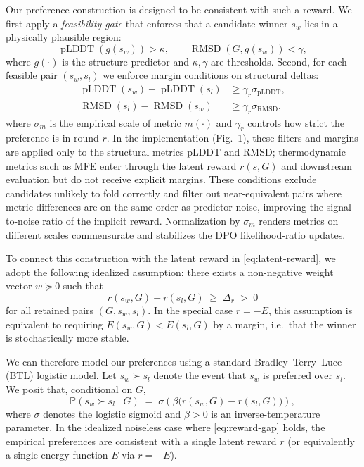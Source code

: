 {{Our preference construction is designed to be consistent with such a reward.
We first apply a \emph{feasibility gate} that enforces that a candidate
winner $s_w$ lies in a physically plausible region:
\begin{equation}
    \operatorname{pLDDT}(g(s_w)) > \kappa, \qquad
    \operatorname{RMSD}(G, g(s_w)) < \gamma,
    \label{eq:gate_appendix_legacy}
\end{equation}
where $g(\cdot)$ is the structure predictor and
$\kappa, \gamma$ are thresholds.
Second, for each feasible pair $(s_w, s_l)$ we enforce margin
conditions on structural deltas:
\begin{align}
    \operatorname{pLDDT}(s_w) - \operatorname{pLDDT}(s_l)
    &\ge \gamma_r \sigma_{\text{pLDDT}},
    \label{eq:margin-plddt}
    \\
    \operatorname{RMSD}(s_l) - \operatorname{RMSD}(s_w)
    &\ge \gamma_r \sigma_{\text{RMSD}},
    \label{eq:margin-rmsd}
\end{align}
where $\sigma_m$ is the empirical scale of metric $m(\cdot)$ and
$\gamma_r$ controls how strict the preference is in round $r$.
In the implementation (Fig.~1), these filters and margins are applied only
to the structural metrics pLDDT and RMSD; thermodynamic metrics such as MFE
enter through the latent reward $r(s,G)$ and downstream evaluation but do
not receive explicit margins.
These conditions exclude candidates unlikely to fold correctly and filter out
near-equivalent pairs where metric differences are on the same order as
predictor noise, improving the signal-to-noise ratio of the implicit reward.
Normalization by $\sigma_m$ renders metrics on different scales commensurate
and stabilizes the DPO likelihood-ratio updates.

To connect this construction with the latent reward in
\eqref{eq:latent-reward}, we adopt the following idealized assumption:
there exists a non-negative weight vector
$w \succeq 0$ such that
\begin{equation}
    r(s_w, G) - r(s_l, G) \;\geq\; \Delta_r \;>\; 0
    \label{eq:reward-gap}
\end{equation}
for all retained pairs $(G, s_w, s_l)$.
In the special case $r=-E$, this assumption is equivalent to requiring
$E(s_w,G) < E(s_l,G)$ by a margin, i.e.\ that the winner is stochastically
more stable.

We can therefore model our preferences using a standard
Bradley--Terry--Luce (BTL) logistic model. Let
$s_w \succ s_l$ denote the event that $s_w$ is preferred over $s_l$.
We posit that, conditional on $G$,
\begin{equation}
    \mathbb{P}(s_w \succ s_l \mid G)
    \;=\;
    \sigma\!\left(
        \beta \bigl(
            r(s_w, G) - r(s_l, G)
        \bigr)
    \right),
    \label{eq:btl}
\end{equation}
where $\sigma$ denotes the logistic sigmoid and
$\beta > 0$ is an inverse-temperature parameter.
In the idealized noiseless case where \eqref{eq:reward-gap} holds,
the empirical preferences are consistent with a single latent reward $r$
(or equivalently a single energy function $E$ via $r=-E$).

}}
